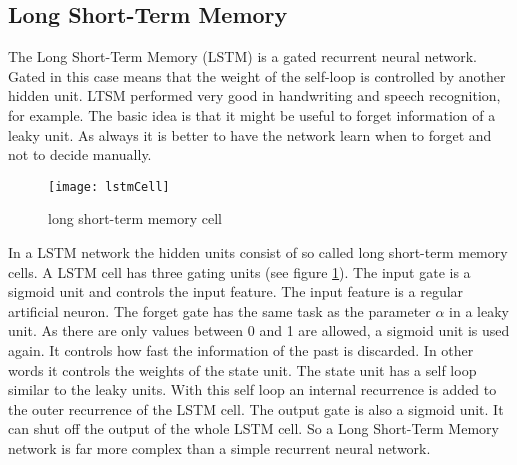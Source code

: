 \subsection{Long Short-Term Memory}
The Long Short-Term Memory (LSTM) is a gated recurrent neural network. Gated in this case means that the weight of the self-loop is controlled by another hidden unit. LTSM performed very good in handwriting and speech recognition, for example. The basic idea is that it might be useful to forget information of a leaky unit. As always it is better to have the network learn when to forget and not to decide manually.\\
\label{sec:lstm}
\begin{figure}[thb]
	\caption{long short-term memory cell \cite[p. 405]{DeepLearning}}
	\texttt{[image: lstmCell]}
	\label{fig:lstm}
\end{figure}
In a LSTM network the hidden units consist of so called long short-term memory cells. A LSTM cell has three gating units (see figure \ref{fig:lstm}). The input gate is a sigmoid unit and controls the input feature. The input feature is a regular artificial neuron. The forget gate has the same task as the parameter $\alpha$ in a leaky unit. As there are only values between 0 and 1 are allowed, a sigmoid unit is used again. It controls how fast the information of the past is discarded. In other words it controls the weights of the state unit. The state unit has a self loop similar to the leaky units. With this self loop an internal recurrence is added to the outer recurrence of the LSTM cell. The output gate is also a sigmoid unit. It can shut off the output of the whole LSTM cell. So a Long Short-Term Memory network is far more complex than a simple recurrent neural network.

